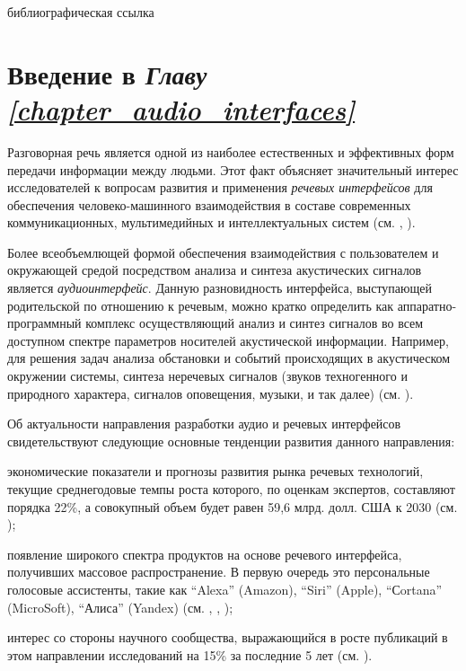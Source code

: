 \begin{SCn}
\bigskip

\begin{scnrelfromlist}{библиографическая ссылка}
\end{scnrelfromlist}

\end{SCn}


\section*{Введение в \textit{Главу \ref{chapter_audio_interfaces}}}
\label{sec_audio_interfaces_review}

Разговорная речь является одной из наиболее естественных и эффективных форм передачи информации между людьми. Этот факт объясняет значительный интерес исследователей к вопросам развития и применения \textit{речевых интерфейсов} для обеспечения человеко-машинного взаимодействия в составе современных коммуникационных, мультимедийных и интеллектуальных систем (см. , ).

Более всеобъемлющей формой обеспечения взаимодействия с пользователем и окружающей средой посредством анализа и синтеза акустических сигналов является \textit{аудиоинтерфейс}. Данную разновидность интерфейса, выступающей родительской по отношению к речевым, можно кратко определить как аппаратно-программный комплекс осуществляющий анализ и синтез сигналов во всем доступном спектре параметров носителей акустической информации. Например, для решения задач анализа обстановки и событий происходящих в акустическом окружении системы, синтеза неречевых сигналов (звуков техногенного и природного характера, сигналов оповещения, музыки, и так далее) (см. ).

Об актуальности направления разработки аудио и речевых интерфейсов свидетельствуют следующие основные тенденции развития данного направления:
\begin{textitemize}    
    \item экономические показатели и прогнозы развития рынка речевых технологий, текущие среднегодовые темпы роста которого, по оценкам экспертов, составляют порядка 22\%, а совокупный объем будет равен 59,6 млрд. долл. США к 2030 (см. );
    \item появление широкого спектра продуктов на основе речевого интерфейса, получивших массовое распространение. В первую очередь это персональные голосовые ассистенты, такие как  ``Alexa'' (Amazon), ``Siri'' (Apple), ``Сortana'' (MicroSoft), ``Алиса'' (Yandex) (см. , , );
    \item интерес со стороны научного сообщества, выражающийся в росте публикаций в этом направлении исследований на 15\% за последние 5 лет (см. ).
\end{textitemize}

